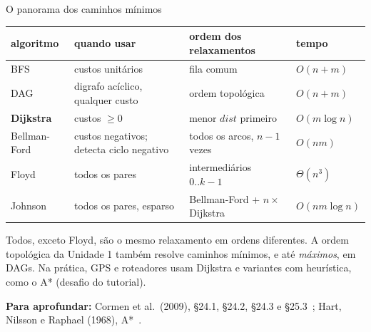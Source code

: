 \documentclass[aspectratio=169,xcolor=table]{beamer}
\newcommand{\fonte}[1]{%
  \vfill
  {\tiny\color{gray!55!black}\textbf{Para aprofundar:} #1\par}%
}
\begin{document}
\begin{frame}{O panorama dos caminhos mínimos}
  \begin{center}
  \scriptsize
  \begin{tabular}{llll}
    \toprule
    algoritmo & quando usar & ordem dos relaxamentos & tempo \\
    \midrule
    BFS & custos unitários & fila comum & $O(n + m)$ \\
    DAG & digrafo acíclico, qualquer custo & ordem topológica & $O(n + m)$ \\
    \textbf{Dijkstra} & custos $\ge 0$ & menor $\mathit{dist}$ primeiro & $O(m \log n)$ \\
    Bellman-Ford & custos negativos; detecta ciclo negativo & todos os arcos, $n - 1$ vezes & $O(nm)$ \\
    Floyd & todos os pares & intermediários $0..k-1$ & $\Theta(n^3)$ \\
    Johnson & todos os pares, esparso & Bellman-Ford + $n \times$ Dijkstra & $O(nm \log n)$ \\
    \bottomrule
  \end{tabular}
  \end{center}
  \medskip
  {\scriptsize Todos, exceto Floyd, são o mesmo relaxamento em ordens diferentes. A ordem
  topológica da Unidade 1 também resolve caminhos mínimos, e até \emph{máximos}, em DAGs.
  Na prática, GPS e roteadores usam Dijkstra e variantes com heurística, como o A*
  (desafio do tutorial).\par}
  \fonte{Cormen et al.\ (2009), \S 24.1, \S 24.2, \S 24.3 e \S 25.3~\cite{cormen2009introduction};
    Hart, Nilsson e Raphael (1968), A*~\cite{hart1968formal}.}
\end{frame}
\end{document}
